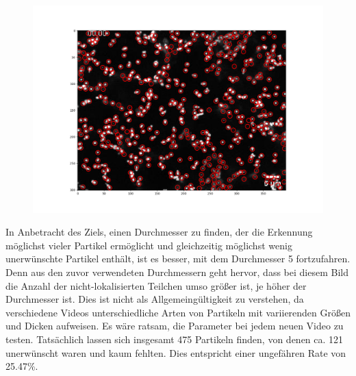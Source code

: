 \begin{enumerate}
\begin{figure}[H]
	\begin{minipage}{.5\textwidth}
     	\centering
  	  	\includegraphics[scale=0.3]{Grafiken/trackpyBilder/locate(frames[0], 5).png}
 		 \label{fig:kap3_d=5}
    \end{minipage}
\end{figure}

In Anbetracht des Ziels, einen Durchmesser zu finden, der die Erkennung möglichst vieler Partikel ermöglicht und gleichzeitig möglichst wenig unerwünschte Partikel enthält, ist es besser, mit dem Durchmesser 5 fortzufahren. Denn aus den zuvor verwendeten Durchmessern geht hervor, dass bei diesem Bild die Anzahl der nicht-lokalisierten Teilchen umso größer ist, je höher der Durchmesser ist. 
Dies ist nicht als Allgemeingültigkeit zu verstehen, da verschiedene Videos unterschiedliche Arten von Partikeln mit variierenden Größen und Dicken aufweisen. Es wäre ratsam, die Parameter bei jedem neuen Video zu testen.
Tatsächlich lassen sich insgesamt 475 Partikeln finden, von denen ca. 121 unerwünscht waren und kaum fehlten. Dies entspricht einer ungefähren Rate von 25.47\%.


\end{enumerate}
